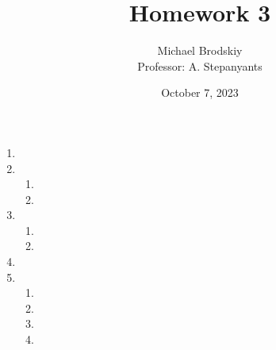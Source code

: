 


\title{Homework 3}
\date{October 7, 2023}
\author{Michael Brodskiy\\ \small Professor: A. Stepanyants}



\maketitle

\begin{enumerate}

  \item

  \item

    \begin{enumerate}

      \item 

      \item 

    \end{enumerate}

    \setcounter{enumi}{3}

  \item

    \begin{enumerate}

      \item 

      \item 

    \end{enumerate}

  \item

  \item

    \begin{enumerate}

      \item 

      \item 

      \item 

      \item 

    \end{enumerate}

\end{enumerate}



